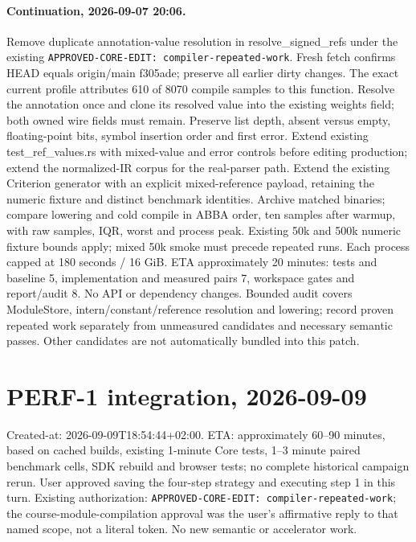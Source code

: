 \documentclass[11pt,a4paper]{article}
\begin{document}
\paragraph{Continuation, 2026-09-07 20:06.} Remove duplicate annotation-value
resolution in resolve\_signed\_refs under the existing
\texttt{APPROVED-CORE-EDIT: compiler-repeated-work}. Fresh fetch confirms
HEAD equals origin/main f305ade; preserve all earlier dirty changes. The exact
current profile attributes 610 of 8070 compile samples to this function.
Resolve the annotation once and clone its resolved value into the existing weights
field; both owned wire fields must remain. Preserve list depth, absent versus empty,
floating-point bits, symbol insertion order and first error. Extend existing
test\_ref\_values.rs with mixed-value and error controls before editing production;
extend the normalized-IR corpus for the real-parser path. Extend the existing
Criterion generator with an explicit mixed-reference payload, retaining the numeric
fixture and distinct benchmark identities. Archive matched binaries; compare lowering
and cold compile in ABBA order, ten samples after warmup, with raw samples, IQR,
worst and process peak. Existing 50k and 500k numeric fixture bounds apply; mixed
50k smoke must precede repeated runs. Each process capped at 180 seconds / 16 GiB.
ETA approximately 20 minutes: tests and baseline 5, implementation and measured
pairs 7, workspace gates and report/audit 8. No API or dependency changes.
Bounded audit covers ModuleStore, intern/constant/reference resolution and lowering;
record proven repeated work separately from unmeasured candidates and necessary
semantic passes. Other candidates are not automatically bundled into this patch.
\begin{center}\end{center}

\section*{PERF-1 integration, 2026-09-09}
Created-at: 2026-09-09T18:54:44+02:00. ETA: approximately 60--90 minutes, based on cached builds,
existing 1-minute Core tests, 1--3 minute paired benchmark cells, SDK rebuild
and browser tests; no complete historical campaign rerun.
User approved saving the four-step strategy and executing step 1 in this turn.
Existing authorization: \texttt{APPROVED-CORE-EDIT: compiler-repeated-work};
the course-module-compilation approval was the user's affirmative reply to
that named scope, not a literal token. No new semantic or accelerator work.
\end{document}
